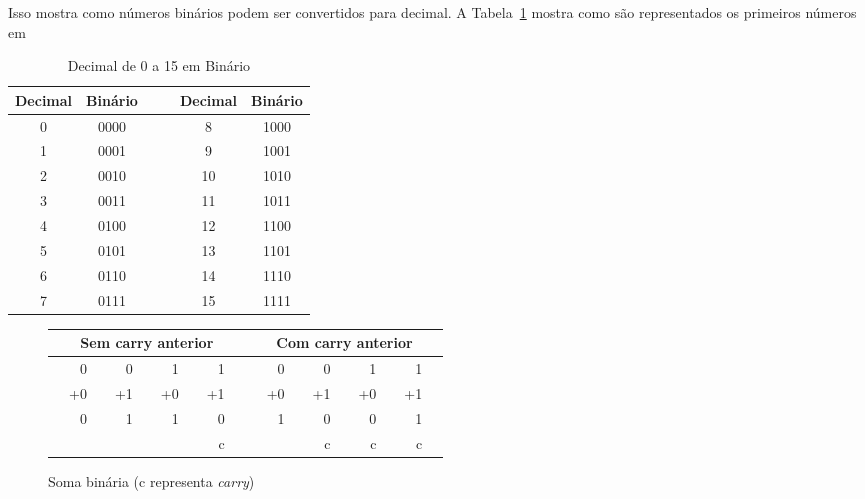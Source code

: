 Isso mostra como números binários podem ser convertidos para decimal. A 
Tabela~\ref{tab:dec-bin} mostra como são representados os primeiros números em 
\begin{table}[t]
\begin{center}
\begin{tabular}{||c|c||cc||c|c||}
\hline
Decimal & Binário & & & Decimal & Binário \\
\hline
0       & 0000   & & & 8       & 1000 \\
\hline
1       & 0001   & & & 9       & 1001 \\
\hline
2       & 0010   & & & 10      & 1010 \\
\hline
3       & 0011   & & & 11      & 1011 \\
\hline
4       & 0100   & & & 12      & 1100 \\
\hline
5       & 0101   & & & 13      & 1101 \\
\hline
6       & 0110   & & & 14      & 1110 \\
\hline
7       & 0111   & & & 15      & 1111 \\
\hline
\end{tabular}
\caption{Decimal de 0 a 15 em Binário\label{tab:dec-bin}}
\end{center}
\end{table}


\begin{figure}[h]
\begin{center}
\begin{tabular}{|rrrrrrrrp{.1cm}|p{.1cm}rrrrrrrr|}
\hline
& \multicolumn{7}{c}{Sem carry anterior} & & & \multicolumn{7}{c}{Com carry anterior} & \\
\hline
&  0 & &  0 & &  1 & &  1 & & &  0 & &  0 & &  1 & & 1  & \\
& +0 & & +1 & & +0 & & +1 & & & +0 & & +1 & & +0 & & +1 &  \\
\cline{2-2} \cline{4-4} \cline{6-6} \cline{8-8} \cline{11-11} \cline{13-13} \cline{15-15} \cline{17-17}
& 0  & & 1  & & 1  & & 0  & & & 1  & & 0  & & 0  & & 1 & \\
&    & &    & &    & & c  & & &    & & c  & & c  & & c & \\
\hline
\end{tabular}

\caption{Soma binária (c representa \emph{carry})\label{fig:bin-add}}
\end{center}
\end{figure}

